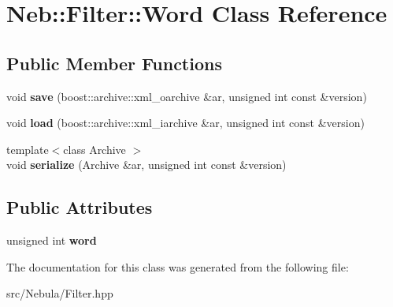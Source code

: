 \hypertarget{classNeb_1_1Filter_1_1Word}{\section{\-Neb\-:\-:\-Filter\-:\-:\-Word \-Class \-Reference}
\label{classNeb_1_1Filter_1_1Word}
}
\subsection*{\-Public \-Member \-Functions}
\begin{DoxyCompactItemize}
\item 
\hypertarget{classNeb_1_1Filter_1_1Word_a68ed4376e2575296ce033bcecfc1ba7c}{void {\bfseries save} (boost\-::archive\-::xml\-\_\-oarchive \&ar, unsigned int const \&version)}\label{classNeb_1_1Filter_1_1Word_a68ed4376e2575296ce033bcecfc1ba7c}

\item 
\hypertarget{classNeb_1_1Filter_1_1Word_a6f275867b6bf60faf934cff9ff3daadf}{void {\bfseries load} (boost\-::archive\-::xml\-\_\-iarchive \&ar, unsigned int const \&version)}\label{classNeb_1_1Filter_1_1Word_a6f275867b6bf60faf934cff9ff3daadf}

\item 
\hypertarget{classNeb_1_1Filter_1_1Word_a00a33a481c53a9280b9f8c4e408e8ad2}{{\footnotesize template$<$class Archive $>$ }\\void {\bfseries serialize} (\-Archive \&ar, unsigned int const \&version)}\label{classNeb_1_1Filter_1_1Word_a00a33a481c53a9280b9f8c4e408e8ad2}

\end{DoxyCompactItemize}
\subsection*{\-Public \-Attributes}
\begin{DoxyCompactItemize}
\item 
\hypertarget{classNeb_1_1Filter_1_1Word_a6ccc8350b1c59e2dcc3f81fec23f709c}{unsigned int {\bfseries word}}\label{classNeb_1_1Filter_1_1Word_a6ccc8350b1c59e2dcc3f81fec23f709c}

\end{DoxyCompactItemize}


\-The documentation for this class was generated from the following file\-:\begin{DoxyCompactItemize}
\item 
src/\-Nebula/\-Filter.\-hpp\end{DoxyCompactItemize}
